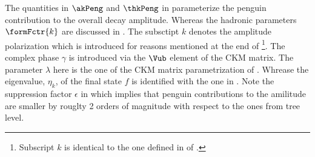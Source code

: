 \noindent The quantities in $\akPeng$ and $\thkPeng$ in  parameterize the penguin contribution to the overall \BsJpsiPhi
decay amplitude. Whereas the hadronic parameters $\formFctr{k}$ are discussed in .
The subsctipt $k$ denotes the \BsJpsiPhi amplitude polarization which is introduced for reasons mentioned at the end of
\footnote{Subscript $k$ is identical to the one defined in  of .}.
The complex phase $\gamma$ is introduced via the $\Vub$ element of the CKM matrix. The parameter $\lambda$ here is the one of the
CKM matrix parametrization of . Whrease the eigenvalue, $\eta_k$, of the final state $f$ is identified with the one in .
Note the suppression factor $\epsilon$ in  which implies that penguin contributions to the \BsJpsiPhi amilitude are smaller
by rouglty 2 orders of magnitude with respect to the ones from tree level.
